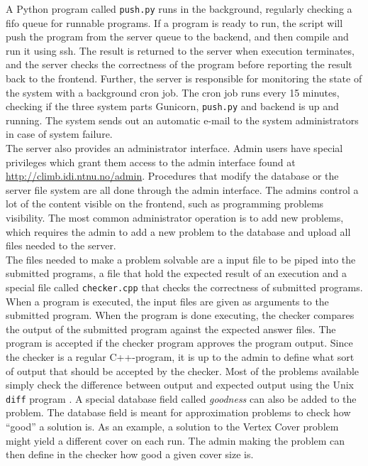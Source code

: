 A Python program called \texttt{push.py} runs in the background, regularly checking a \gls{fifo} queue for runnable programs. If a program is ready to run, the script will push the program from the server queue to the backend, and then compile and run it using \gls{ssh}. The result is returned to the server when execution terminates, and the server checks the correctness of the program before reporting the result back to the frontend. Further, the server is responsible for monitoring the state of the system with a background cron job. The cron job runs every 15 minutes, checking if the three system parts Gunicorn, \texttt{push.py} and backend is up and running. The system sends out an automatic e-mail to the system administrators in case of system failure. \\

The server also provides an administrator interface. Admin users have special privileges which grant them access to the admin interface found at \url{http://climb.idi.ntnu.no/admin}. Procedures that modify the database or the server file system are all done through the admin interface. The admins control a lot of the content visible on the frontend, such as programming problems visibility. The most common administrator operation is to add new problems, which requires the admin to add a new problem to the database and upload all files needed to the server. \\

The files needed to make a problem solvable are a input file to be piped into the submitted programs, a file that hold the expected result of an execution and a special file called \texttt{checker.cpp} that checks the correctness of submitted programs. When a program is executed, the input files are given as arguments to the submitted program. When the program is done executing, the checker compares the output of the submitted program against the expected answer files. The program is accepted if the checker program approves the program output. Since the checker is a regular C++-program, it is up to the admin to define what sort of output that should be accepted by the checker. Most of the problems available simply check the difference between output and expected output using the Unix \texttt{diff} program \cite{DIFF}. A special database field called \textit{goodness} can also be added to the problem. The database field is meant for approximation problems to check how ``good'' a solution is. As an example, a solution to the Vertex Cover problem might yield a different cover on each run. The admin making the problem can then define in the checker how good a given cover size is.

